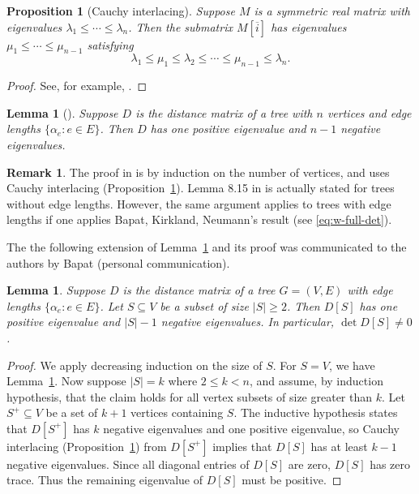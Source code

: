 \documentclass[12pt]{amsart}
\newtheorem{prop}[thm]{Proposition}
\newtheorem{lem}[thm]{Lemma}
\theoremstyle{definition}
\newtheorem{rmk}[thm]{Remark}
\newcommand{\Da}{{D}}
\begin{document}
\begin{prop}[Cauchy interlacing]
\label{prop:cauchy-interlacing}
Suppose $M$ is a symmetric real matrix  with eigenvalues $\lambda_1 \leq \cdots \leq \lambda_n$. 
Then the submatrix $M[\overline{i}]$ has eigenvalues $\mu_1 \leq \cdots \leq \mu_{n-1}$ satisfying
\[
	\lambda_1 \leq \mu_1 \leq \lambda_2 \leq \cdots \leq \mu_{n-1} \leq \lambda_n.
\]
\end{prop}
\begin{proof}
See, for example, \cite[Theorem 4.3.17]{horn-johnson}.
\end{proof}

\begin{lem}[{\cite[Lemma 8.15]{bapat-book}}]
\label{lem:dist-signature}
Suppose $\Da$ is the distance matrix of a tree with $n$ vertices and edge lengths $\{\alpha_e \colon e \in E\}$. 
Then $\Da$ has one positive eigenvalue and $n - 1$ negative eigenvalues.
\end{lem}
\begin{rmk}
The proof in \cite{bapat-book} is by induction on the number of vertices, and uses Cauchy interlacing (Proposition~\ref{prop:cauchy-interlacing}). Lemma 8.15 in \cite{bapat-book} is actually stated for trees without edge lengths. However, the same argument applies to trees with edge lengths if one applies Bapat, Kirkland, Neumann's result \cite[Corollary 2.5]{bapat-kirkland-neumann} (see \eqref{eq:w-full-det}). 
\end{rmk}
The the following extension of Lemma~\ref{lem:dist-signature} and its proof was communicated to the authors by Bapat (personal communication).
\begin{lem}
\label{lem:distance-sub-nonsingular}
Suppose $\Da$ is the distance matrix of a tree $G = (V,E)$ with edge lengths $\{\alpha_e \colon e \in E\}$. Let $S \subseteq V$ be a subset of size $|S| \geq 2$. 
Then $\Da[S]$ has one positive eigenvalue and $|S| - 1$ negative eigenvalues.
In particular, $\det \Da[S] \neq 0$.
\end{lem}
\begin{proof}
We apply decreasing induction on the size of $S$. 
For $S = V$, we have Lemma~\ref{lem:dist-signature}.
Now suppose $|S| = k$ where $2 \leq k < n$, and assume, by induction hypothesis, 
that the claim holds for all vertex subsets of size greater than $k$.
Let $S^+ \subseteq V$ be a set of $k + 1$ vertices containing $S$.
The inductive hypothesis states that $D[S^+]$ has $k$ negative eigenvalues and one positive eigenvalue,
so Cauchy interlacing (Proposition~\ref{prop:cauchy-interlacing}) from $D[S^+]$ implies that $D[S]$ has at least $k - 1$ negative eigenvalues. 
Since all diagonal entries of $D[S]$ are zero, $D[S]$ has zero trace. 
Thus the remaining eigenvalue of $D[S]$ must be positive.
\end{proof}
\end{document}
